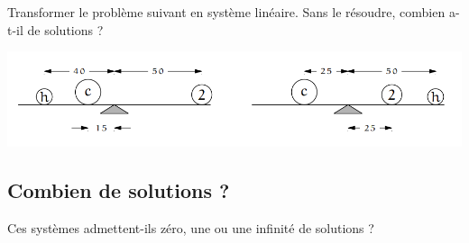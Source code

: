   \vspace{1em}

  Transformer le problème suivant en système linéaire. Sans le résoudre, combien a-t-il de solutions ?
  \begin{center}
    \includegraphics[width=0.8\linewidth]{0-Revisions/2-PivotDeGauss/equilibre.png}
  \end{center}

  \newpage

  \vspace{2em}

  \subsection{Combien de solutions ?}
Ces systèmes admettent-ils zéro, une ou une infinité de solutions ?


